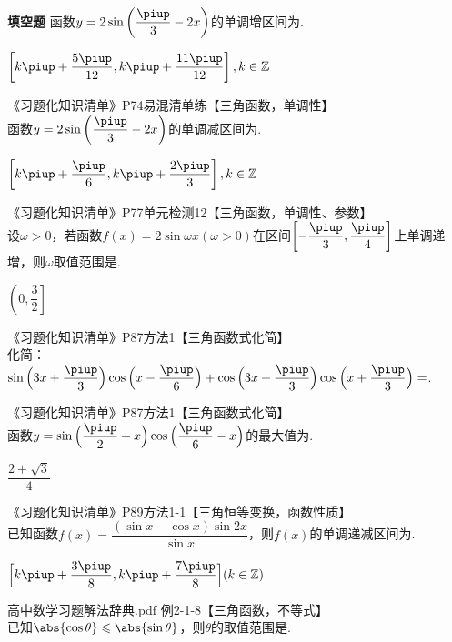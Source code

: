 \begin{exercise}{\bf 填空题}
      函数$y=2\sin\left(\dfrac{\piup}3-2x \right)$的单调增区间为\tk.
      \begin{answer}
        $\left[k\piup+\dfrac{5\piup}{12},k\piup+\dfrac{11\piup}{12} \right],k\in\mathbb{Z}$
      \end{answer}
    \item 《习题化知识清单》P74易混清单练【三角函数，单调性】\\
      函数$y=2\sin\left(\dfrac{\piup}3-2x \right)$的单调减区间为\tk.
      \begin{answer}
        $\left[k\piup+\dfrac{\piup}6,k\piup+\dfrac{2\piup}3 \right],k\in\mathbb{Z}$
      \end{answer}
    \item 《习题化知识清单》P77单元检测12【三角函数，单调性、参数】\\
      设$\omega>0$，若函数$f(x)=2\sin \omega x(\omega>0)$在区间$\left[-\dfrac{\piup}3,\dfrac{\piup}4 \right]$上单调递增，则$\omega$取值范围是\tk.
      \begin{answer}
        $\left(0,\dfrac32\right]$
      \end{answer}
    \item 《习题化知识清单》P87方法1【三角函数式化简】\\
      化简：
      $\sin{\Bigl(3x+\dfrac{\piup}3\Bigr)}\cos{\Bigl(x-\dfrac{\piup}6\Bigr)}+\cos{\Bigl(3x+\dfrac{\piup}3\Bigr)}\cos{\Bigl(x+\dfrac{\piup}3\Bigr)}=$\tk.
      \begin{answer}
      \end{answer}
    \item 《习题化知识清单》P87方法1【三角函数式化简】\\
      函数$y=\sin{\Bigl(\dfrac{\piup}2+x\Bigr)\cos{\Bigl(\dfrac{\piup}6-x\Bigr)}}$的最大值为\tk.
      \begin{answer}
        $\dfrac{2+\sqrt{3}}4$
      \end{answer}
    \item 《习题化知识清单》P89方法1-1【三角恒等变换，函数性质】\\
      已知函数$f(x)=\dfrac{(\sin x-\cos x)\sin {2x}}{\sin x}$，则$f(x)$的单调递减区间为\tk[6].
     \begin{answer}
       $\Bigl[k\piup+\dfrac{3\piup}8,k\piup+\dfrac{7\piup}8\Bigr](k\in\mathbb{Z})$
     \end{answer}
    \item 高中数学习题解法辞典.pdf 例2-1-8【三角函数，不等式】\\
     已知$\abs{\cos \theta}\leqslant \abs{\sin\theta}$，则$\theta$的取值范围是\tk.

\end{exercise}

